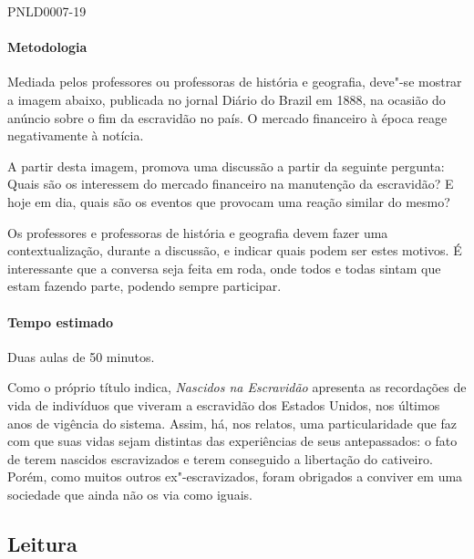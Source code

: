 \documentclass[11pt]{extarticle}
\begin{document}
\begin{enumerate}
\begin{enumerate}
\begin{enumerate}
 {PNLD0007-19}

\paragraph{Metodologia}

  Mediada pelos professores ou professoras de história e geografia, deve"-se mostrar a imagem abaixo,
  publicada no jornal Diário do Brazil em 1888, na ocasião do anúncio sobre o fim da escravidão no país.
  O mercado financeiro à época reage negativamente à notícia.
 

  A partir desta imagem, promova uma discussão a partir da seguinte pergunta: Quais são
  os interessem do mercado financeiro na manutenção da escravidão? E hoje em dia,
  quais são os eventos que provocam uma reação similar do mesmo?  

  Os professores e professoras de história e geografia devem fazer uma contextualização,
  durante a discussão, e indicar quais podem ser estes motivos. É interessante que a conversa
  seja feita em roda, onde todos e todas sintam que estam fazendo parte, podendo
  sempre participar.

  \paragraph{Tempo estimado} Duas aulas de 50 minutos.


Como o próprio título indica, \emph{Nascidos na Escravidão}
apresenta as recordações de vida de indivíduos que viveram a escravidão
dos Estados Unidos, nos últimos anos de vigência do sistema. Assim, há,
nos relatos, uma particularidade que faz com que suas vidas sejam
distintas das experiências de seus antepassados: o fato de terem
nascidos escravizados e terem conseguido a libertação do cativeiro.
Porém, como muitos outros ex"-escravizados, foram obrigados a conviver em
uma sociedade que ainda não os via como iguais.


\subsection{Leitura}


\end{enumerate}
\end{enumerate}
\end{enumerate}
\end{document}
